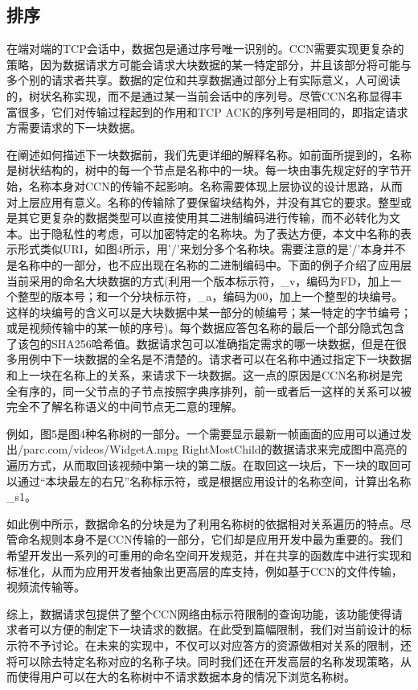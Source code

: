 \subsection*{排序}
\par
在端对端的TCP会话中，数据包是通过序号唯一识别的。CCN需要实现更复杂的策略，因为数据请求方可能会请求大块数据的某一特定部分，并且该部分将可能与多个别的请求者共享。数据的定位和共享数据通过部分上有实际意义，人可阅读的，树状名称实现，而不是通过某一当前会话中的序列号。尽管CCN名称显得丰富很多，它们对传输过程起到的作用和TCP ACK的序列号是相同的，即指定请求方需要请求的下一块数据。
\par
在阐述如何描述下一块数据前，我们先更详细的解释名称。如前面所提到的，名称是树状结构的，树中的每一个节点是名称中的一块。每一块由事先规定好的字节开始，名称本身对CCN的传输不起影响。名称需要体现上层协议的设计思路，从而对上层应用有意义。名称的传输除了要保留块结构外，并没有其它的要求。整型或是其它更复杂的数据类型可以直接使用其二进制编码进行传输，而不必转化为文本。出于隐私性的考虑，可以加密特定的名称块。为了表达方便，本文中名称的表示形式类似URI，如图4所示，用’/’来划分多个名称块。需要注意的是’/’本身并不是名称中的一部分，也不应出现在名称的二进制编码中。下面的例子介绍了应用层当前采用的命名大块数据的方式(利用一个版本标示符，\_v，编码为FD，加上一个整型的版本号；和一个分块标示符，\_a，编码为00，加上一个整型的块编号。这样的块编号的含义可以是大块数据中某一部分的帧编号；某一特定的字节编号；或是视频传输中的某一帧的序号)。每个数据应答包名称的最后一个部分隐式包含了该包的SHA256哈希值。数据请求包可以准确指定需求的哪一块数据，但是在很多用例中下一块数据的全名是不清楚的。请求者可以在名称中通过指定下一块数据和上一块在名称上的关系，来请求下一块数据。这一点的原因是CCN名称树是完全有序的，同一父节点的子节点按照字典序排列，前一或者后一这样的关系可以被完全不了解名称语义的中间节点无二意的理解。
\par
例如，图5是图4种名称树的一部分。一个需要显示最新一帧画面的应用可以通过发出/parc.com/videos/WidgetA.mpg RightMostChild的数据请求来完成图中高亮的遍历方式，从而取回该视频中第一块的第二版。在取回这一块后，下一块的取回可以通过“本块最左的右兄”名称标示符，或是根据应用设计的名称空间，计算出名称\_s1。
\par
如此例中所示，数据命名的分块是为了利用名称树的依据相对关系遍历的特点。尽管命名规则本身不是CCN传输的一部分，它们却是应用开发中最为重要的。我们希望开发出一系列的可重用的命名空间开发规范，并在共享的函数库中进行实现和标准化，从而为应用开发者抽象出更高层的库支持，例如基于CCN的文件传输，视频流传输等。
\par
综上，数据请求包提供了整个CCN网络由标示符限制的查询功能，该功能使得请求者可以方便的制定下一块请求的数据。在此受到篇幅限制，我们对当前设计的标示符不予讨论。在未来的实现中，不仅可以对应答方的资源做相对关系的限制，还将可以除去特定名称对应的名称子块。同时我们还在开发高层的名称发现策略，从而使得用户可以在大的名称树中不请求数据本身的情况下浏览名称树。

